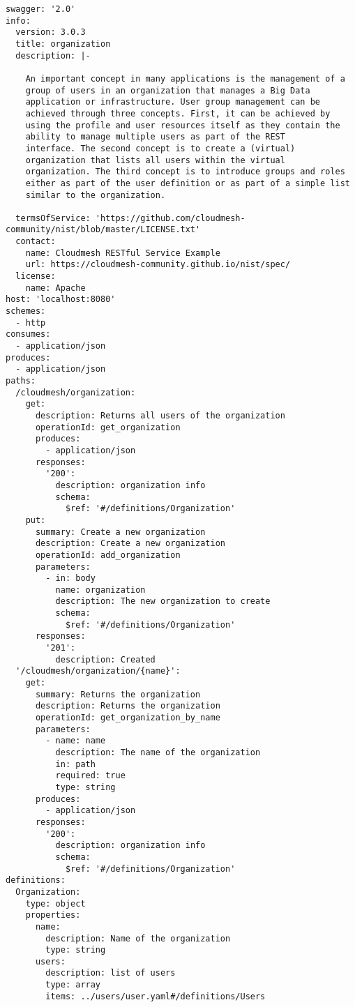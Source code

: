 \documentclass[9pt,]{article}
\begin{document}
\begin{verbatim}
swagger: '2.0'
info:
  version: 3.0.3
  title: organization
  description: |-
  
    An important concept in many applications is the management of a
    group of users in an organization that manages a Big Data
    application or infrastructure. User group management can be
    achieved through three concepts. First, it can be achieved by
    using the profile and user resources itself as they contain the
    ability to manage multiple users as part of the REST
    interface. The second concept is to create a (virtual)
    organization that lists all users within the virtual
    organization. The third concept is to introduce groups and roles
    either as part of the user definition or as part of a simple list
    similar to the organization.

  termsOfService: 'https://github.com/cloudmesh-community/nist/blob/master/LICENSE.txt'
  contact:
    name: Cloudmesh RESTful Service Example
    url: https://cloudmesh-community.github.io/nist/spec/
  license:
    name: Apache
host: 'localhost:8080'
schemes:
  - http
consumes:
  - application/json
produces:
  - application/json
paths:
  /cloudmesh/organization:
    get:
      description: Returns all users of the organization
      operationId: get_organization
      produces:
        - application/json
      responses:
        '200':
          description: organization info
          schema:
            $ref: '#/definitions/Organization'
    put:
      summary: Create a new organization
      description: Create a new organization
      operationId: add_organization
      parameters:
        - in: body
          name: organization
          description: The new organization to create
          schema:
            $ref: '#/definitions/Organization'
      responses:
        '201':
          description: Created
  '/cloudmesh/organization/{name}':
    get:
      summary: Returns the organization 
      description: Returns the organization
      operationId: get_organization_by_name
      parameters:
        - name: name
          description: The name of the organization
          in: path
          required: true
          type: string
      produces:
        - application/json
      responses:
        '200':
          description: organization info
          schema:
            $ref: '#/definitions/Organization'
definitions:
  Organization:
    type: object
    properties:
      name:
        description: Name of the organization
        type: string
      users:
        description: list of users
        type: array
        items: ../users/user.yaml#/definitions/Users


\end{verbatim}
\end{document}
